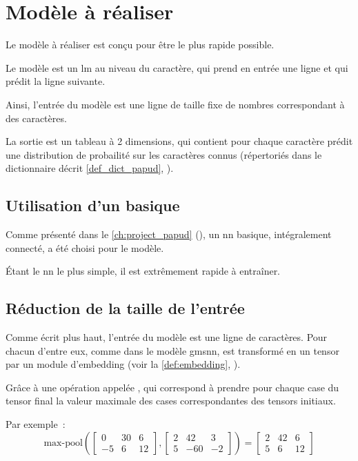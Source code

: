 \chapter{Modèle à réaliser}\label{ch:papud_model}
Le modèle à réaliser est conçu pour être le plus rapide possible.

Le modèle est un \gls{lm} au niveau du caractère, qui prend en entrée une ligne et qui prédit la ligne suivante.

Ainsi, l'entrée du modèle est une ligne de taille fixe de nombres correspondant à des caractères.

La sortie est un tableau à 2 dimensions, qui contient pour chaque caractère prédit une distribution de probailité sur les caractères connus (répertoriés dans le dictionnaire décrit \autoref{def_dict_papud}, ).

\section{Utilisation d'un  basique}
Comme présenté dans le \autoref{ch:project_papud} (), un \gls{nn} basique, intégralement connecté, a été choisi pour le modèle.

Étant le \gls{nn} le plus simple, il est extrêmement rapide à entraîner.

\section{Réduction de la taille de l'entrée}
Comme écrit plus haut, l'entrée du modèle est une ligne de caractères.
Pour chacun d'entre eux, comme dans le modèle \gls{gmsnn}, est transformé en un \gls{tensor} par un module d'\gls{embedding} (voir la \autoref{def:embedding}, ).

Grâce à une opération appelée \og {} \fg{}, qui correspond à prendre pour chaque case du \gls{tensor} final la valeur maximale des cases correspondantes des \glspl{tensor} initiaux.

Par exemple~:
\[ \text{max-pool}\left(\left[\begin{array}{ccc}0&30&6\\-5&6&12\end{array}\right] , \left[ \begin{array}{ccc}2&42&3\\5&-60&-2\end{array}\right] \right) = \left[\begin{array}{ccc}2&42&6\\5&6&12\end{array}\right]  \]

